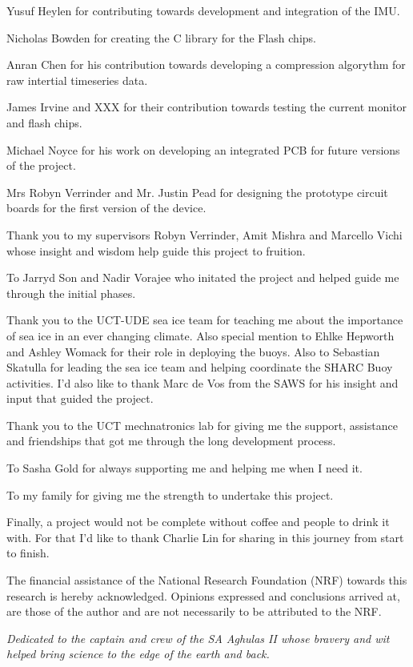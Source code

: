 \documentclass[a4paper, 12pt, oneside, openright, parskip=full]{book}
\newcommand{\nrf}									   
{	
The financial assistance of the National Research Foundation (NRF) towards this research is hereby acknowledged. Opinions expressed and conclusions arrived at, are those of the author and are not necessarily to be attributed to the NRF.
}
\begin{document}
Yusuf Heylen for contributing towards development and integration of the IMU.

Nicholas Bowden for creating the C library for the Flash chips.

Anran Chen for his contribution towards developing a compression algorythm for raw intertial timeseries data.

James Irvine and XXX for their contribution towards testing the current monitor and flash chips.

Michael Noyce for his work on developing an integrated PCB for future versions of the project.

Mrs Robyn Verrinder and Mr. Justin Pead for designing the prototype circuit boards for the first version of the device.

Thank you to my supervisors Robyn Verrinder, Amit Mishra and Marcello Vichi whose insight and wisdom help guide this project to fruition.

To Jarryd Son and Nadir Vorajee who initated the project and helped guide me through the initial phases. 
 
Thank you to the UCT-UDE sea ice team for teaching me about the importance of sea ice in an ever changing climate. Also special mention to Ehlke Hepworth and Ashley Womack for their role in deploying the buoys. Also to Sebastian Skatulla for leading the sea ice team and helping coordinate the SHARC Buoy activities. I'd also like to thank Marc de Vos from the SAWS for his insight and input that guided the project.

Thank you to the UCT mechnatronics lab for giving me the support, assistance and friendships that got me through the long development process. 

To Sasha Gold for always supporting me and helping me when I need it.

To my family for giving me the strength to undertake this project.

Finally, a project would not be complete without coffee and people to drink it with. For that I'd like to thank Charlie Lin for sharing in this journey from start to finish.

\nrf
\begin{flushright}
	\centering
	\vspace*{10cm}
	{\itshape Dedicated to the captain and crew of the SA Aghulas II whose bravery and wit helped bring science to the edge of the earth and back.\\}
\end{flushright}
\tableofcontents
\end{document}
